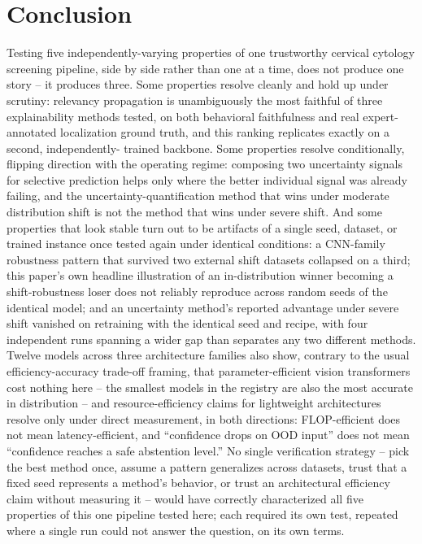 \documentclass[runningheads]{llncs}
\begin{document}
\section{Conclusion}

Testing five independently-varying properties of one trustworthy cervical
cytology screening pipeline, side by side rather than one at a time, does
not produce one story -- it produces three. Some properties resolve
cleanly and hold up under scrutiny: relevancy propagation is unambiguously
the most faithful of three explainability methods tested, on both
behavioral faithfulness and real expert-annotated localization ground
truth, and this ranking replicates exactly on a second, independently-
trained backbone. Some properties resolve conditionally, flipping
direction with the operating regime: composing two uncertainty signals
for selective prediction helps only where the better individual signal
was already failing, and the uncertainty-quantification method that wins
under moderate distribution shift is not the method that wins under
severe shift. And some properties that look stable turn out to be
artifacts of a single seed, dataset, or trained instance once tested
again under identical conditions: a CNN-family robustness pattern that
survived two external shift datasets collapsed on a third; this paper's
own headline illustration of an in-distribution winner becoming a
shift-robustness loser does not reliably reproduce across random seeds of
the identical model; and an uncertainty method's reported advantage under
severe shift vanished on retraining with the identical seed and recipe,
with four independent runs spanning a wider gap than separates any two
different methods. Twelve models across three architecture families also
show, contrary to the usual efficiency-accuracy trade-off framing, that
parameter-efficient vision transformers cost nothing here -- the smallest
models in the registry are also the most accurate in distribution -- and
resource-efficiency claims for lightweight architectures resolve only
under direct measurement, in both directions: FLOP-efficient does not mean
latency-efficient, and ``confidence drops on OOD input'' does not mean
``confidence reaches a safe abstention level.'' No single verification
strategy -- pick the best method once, assume a pattern generalizes across
datasets, trust that a fixed seed represents a method's behavior, or trust
an architectural efficiency claim without measuring it -- would have
correctly characterized all five properties of this one pipeline tested
here; each required its own test, repeated where a single run could not
answer the question, on its own terms.
\end{document}
